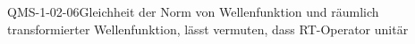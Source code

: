 
\begin{PROP}{QMS-1-02-06}{Gleichheit der Norm von Wellenfunktion und räumlich transformierter Wellenfunktion, lässt vermuten, dass RT-Operator unitär}
\end{PROP}

